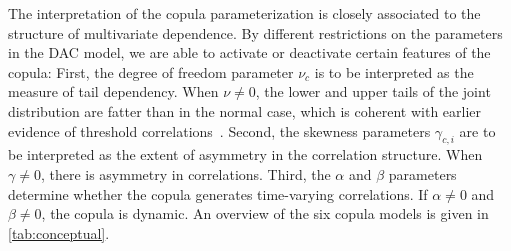 The interpretation of the copula parameterization is closely associated to the structure of multivariate dependence. By different restrictions on the parameters in the DAC model, we are able to activate or deactivate certain features of the copula: First, the degree of freedom parameter $\nu_c$ is to be interpreted as the measure of tail dependency. When $\nu \neq 0$, the lower and upper tails of the joint distribution are fatter than in the normal case, which is coherent with earlier evidence of threshold correlations~\autocite{ChristoffersenLanglois2013}. Second, the skewness parameters $\gamma_{c,i}$ are to be interpreted as the extent of asymmetry in the correlation structure. When $\gamma \neq 0$, there is asymmetry in correlations. Third, the $\alpha$ and $\beta$ parameters determine whether the copula generates time-varying correlations. If $\alpha \neq 0$ and $\beta \neq 0$, the copula is dynamic. An overview of the six copula models is given in \autoref{tab:conceptual}.




